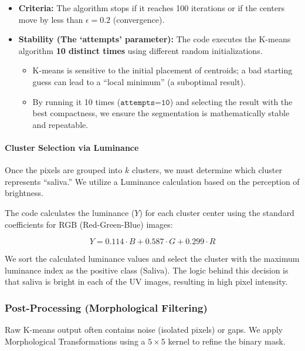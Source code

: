 \begin{itemize}
  \item \textbf{Criteria:} The algorithm stops if it reaches 100 iterations or if the centers move by less than \(\epsilon = 0.2\) (convergence).
  \item \textbf{Stability (The `attempts' parameter):} The code executes the K-means algorithm \textbf{10 distinct times} using different random initializations.
    \begin{itemize}
      \item K-means is sensitive to the initial placement of centroids; a bad starting guess can lead to a ``local minimum'' (a suboptimal result).
      \item By running it 10 times (\(\texttt{attempts=10}\)) and selecting the result with the best compactness, we ensure the segmentation is mathematically stable and repeatable.
    \end{itemize}
\end{itemize}

\paragraph{Cluster Selection via Luminance}

Once the pixels are grouped into \(k\) clusters, we must determine which cluster represents ``saliva.'' We utilize a Luminance calculation based on the perception of brightness.

The code calculates the luminance (\(Y\)) for each cluster center using the standard coefficients for RGB (Red-Green-Blue) images:

\begin{equation}
  Y = 0.114 \cdot B + 0.587 \cdot G + 0.299 \cdot R
\end{equation}

We sort the calculated luminance values and select the cluster with the maximum luminance index as the positive class (Saliva). The logic behind this decision is that saliva is bright in each of the UV images, resulting in high pixel intensity.

\subsubsection{Post-Processing (Morphological Filtering)}

Raw K-means output often contains noise (isolated pixels) or gaps. We apply Morphological Transformations using a \(5 \times 5\) kernel to refine the binary mask.

